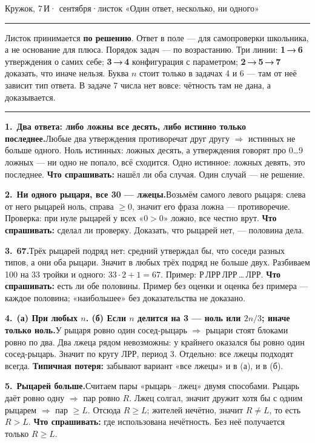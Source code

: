 \documentclass[10pt,a4paper]{article}
\newcommand{\zz}[3]{\par\vspace{5pt}\noindent%
  \textbf{#1.}\ \textbf{#2}\newline\small #3\normalsize\par}
\begin{document}
\hfill{\small Кружок, 7\,И\quad· сентября\quad·\quad листок «Один ответ, несколько, ни одного»}
\vspace{3pt}\hrule\vspace{6pt}

\noindent\small
Листок принимается \textbf{по решению}. Ответ в поле — для самопроверки школьника, а не основание для плюса.
Порядок задач — по возрастанию. Три линии: \textbf{1\,→\,6} утверждения о самих себе; \textbf{3\,→\,4} конфигурация с параметром; \textbf{2\,→\,5\,→\,7} доказать, что иначе нельзя.
Буква $n$ стоит только в задачах 4 и 6 — там от неё зависит тип ответа. В задаче 7 числа нет вовсе: чётность там не дана, а доказывается.\normalsize

\vspace{6pt}\hrule

\zz{1}{Два ответа: либо ложны все десять, либо истинно только последнее.}
{Любые два утверждения противоречат друг другу $\Rightarrow$ истинных не больше одного. Ноль истинных: ложных десять, а утверждения говорят про 0…9 ложных — ни одно не попало, всё сходится. Одно истинное: ложных девять, это последнее.
\textbf{Что спрашивать:} нашёл ли оба случая. Один случай — не решение.}

\zz{2}{Ни одного рыцаря, все 30 — лжецы.}
{Возьмём самого левого рыцаря: слева от него рыцарей ноль, справа $\ge 0$, значит его фраза ложна — противоречие. Проверка: при нуле рыцарей у всех «$0>0$» ложно, все честно врут.
\textbf{Что спрашивать:} сделал ли проверку. Доказать, что рыцарей нет, — половина дела.}

\zz{3}{67.}
{Трёх рыцарей подряд нет: средний утверждал бы, что соседи разных типов, а они оба рыцари. Значит в любых трёх подряд не больше двух. Разбиваем 100 на 33 тройки и одного: $33\cdot2+1=67$. Пример: Р\,ЛРР\,ЛРР\,…\,ЛРР.
\textbf{Что спрашивать:} есть ли обе половины. Пример без оценки и оценка без примера — каждое половина; «наибольшее» без доказательства не доказано.}

\zz{4}{(а) При любых $n$. \quad (б) Если $n$ делится на 3 — ноль или $2n/3$; иначе только ноль.}
{У рыцаря ровно один сосед-рыцарь $\Rightarrow$ рыцари стоят блоками ровно по два. Два лжеца рядом невозможны: у крайнего оказался бы ровно один сосед-рыцарь. Значит по кругу ЛРР, период 3. Отдельно: все лжецы подходят всегда.
\textbf{Типичная потеря:} забывают вариант «все лжецы» и в (а), и в (б).}

\zz{5}{Рыцарей больше.}
{Считаем пары «рыцарь\,--\,лжец» двумя способами. Рыцарь даёт ровно одну $\Rightarrow$ пар ровно $R$. Лжец солгал, значит дружит хотя бы с одним рыцарем $\Rightarrow$ пар $\ge L$. Отсюда $R\ge L$; жителей нечётно, значит $R\ne L$, то есть $R>L$.
\textbf{Что спрашивать:} где использована нечётность. Без неё получается только $R\ge L$.}
\end{document}
